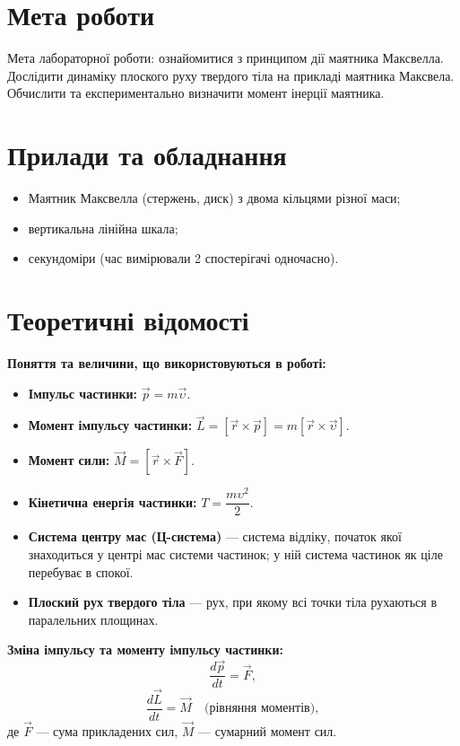 \documentclass[ukrainian]{ucaphyslab}
\begin{document}
\maketitlepage

\section{Мета роботи}
Мета лабораторної роботи: ознайомитися з принципом дії маятника Максвелла. Дослідити динаміку плоского руху твердого тіла на прикладі
маятника Максвела. Обчислити та експериментально визначити момент інерції маятника.


\section{Прилади та обладнання}
\begin{itemize}
  \item Маятник Максвелла (стержень, диск) з двома кільцями різної маси;
  \item вертикальна лінійна шкала;
  \item секундоміри (час вимірювали 2 спостерігачі одночасно).
\end{itemize}

\section{Теоретичні відомості}

\textbf{Поняття та величини, що використовуються в роботі:}
\begin{itemize}
  \item \textbf{Імпульс частинки:} $\vec p = m\vec\upsilon$.
  \item \textbf{Момент імпульсу частинки:} $\vec L = [\vec r\times\vec p] = m[\vec r\times\vec\upsilon]$.
  \item \textbf{Момент сили:} $\vec M = [\vec r\times\vec F]$.
  \item \textbf{Кінетична енергія частинки:} $T = \dfrac{m\upsilon^2}{2}$.
  \item \textbf{Система центру мас (Ц-система)} — система відліку, початок якої знаходиться у центрі мас системи частинок; у ній система частинок як ціле перебуває в спокої.
  \item \textbf{Плоский рух твердого тіла} — рух, при якому всі точки тіла рухаються в паралельних площинах.
\end{itemize}

\textbf{Зміна імпульсу та моменту імпульсу частинки:}
\begin{equation}
  \frac{d\vec p}{dt} = \vec F, \tag{8.1}
\end{equation}
\begin{equation}
  \frac{d\vec L}{dt} = \vec M \quad \text{(рівняння моментів)}, \tag{8.3}
\end{equation}
де $\vec F$ — сума прикладених сил, $\vec M$ — сумарний момент сил.
\end{document}
